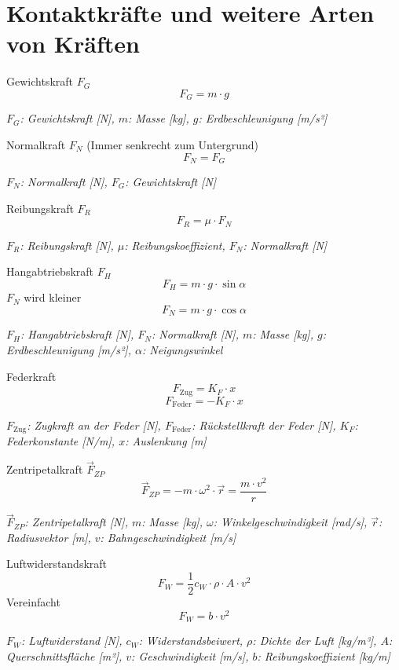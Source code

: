 \documentclass[a4paper,10pt]{article}
\newenvironment{displayformula}
{
	\begin{framed}
		\color{formulaColor}
	}
	{\end{framed}}
\newcommand{\formulalegend}[1]{%
	\par\vspace{0.5ex}%
	{{\color{legendColor}\RaggedRight\small\textit{#1}}}%
	\par\vspace{1.5ex}%
}
\begin{document}
\section{Kontaktkräfte und weitere Arten von Kräften}

\begin{displayformula}
	Gewichtskraft \( F_G \)
	\[
	F_G = m \cdot g
	\]
\end{displayformula}
\formulalegend{
	\( F_G \): Gewichtskraft [N], \( m \): Masse [kg], \( g \): Erdbeschleunigung [m/s²]
}

\begin{displayformula}
	Normalkraft \( F_N \) (Immer senkrecht zum Untergrund)
	\[
	F_N = F_G
	\]
\end{displayformula}
\formulalegend{
	\( F_N \): Normalkraft [N], \( F_G \): Gewichtskraft [N]
}

\begin{displayformula}
	Reibungskraft \( F_R \)
	\[
	F_R = \mu \cdot F_N
	\]
\end{displayformula}
\formulalegend{
	\( F_R \): Reibungskraft [N], \( \mu \): Reibungskoeffizient, \( F_N \): Normalkraft [N]
}

\begin{displayformula}
	Hangabtriebskraft \( F_H \)
	\[
	F_H = m \cdot g \cdot \sin\alpha
	\]
	\( F_N \) wird kleiner
	\[
	F_N = m \cdot g \cdot \cos\alpha
	\]
\end{displayformula}
\formulalegend{
	\( F_H \): Hangabtriebskraft [N], \( F_N \): Normalkraft [N], \( m \): Masse [kg], \( g \): Erdbeschleunigung [m/s²], \( \alpha \): Neigungswinkel
}

\begin{displayformula}
	Federkraft
	\[
	F_{\text{Zug}} = K_F \cdot x
	\]
	\[
	F_{\text{Feder}} = -K_F \cdot x
	\]
\end{displayformula}
\formulalegend{
	\( F_{\text{Zug}} \): Zugkraft an der Feder [N], \( F_{\text{Feder}} \): Rückstellkraft der Feder [N], \( K_F \): Federkonstante [N/m], \( x \): Auslenkung [m]
}

\begin{displayformula}
	Zentripetalkraft \( \vec{F}_{ZP} \)
	\[
	\vec{F}_{ZP} = -m \cdot \omega^2 \cdot \vec{r} = \frac{m \cdot v^2}{r}
	\]
\end{displayformula}
\formulalegend{
	\( \vec{F}_{ZP} \): Zentripetalkraft [N], \( m \): Masse [kg], \( \omega \): Winkelgeschwindigkeit [rad/s], \( \vec{r} \): Radiusvektor [m], \( v \): Bahngeschwindigkeit [m/s]
}

\begin{displayformula}
	Luftwiderstandskraft
	\[
	F_W = \frac{1}{2} c_W \cdot \rho \cdot A \cdot v^2
	\]
	Vereinfacht
	\[
	F_W = b \cdot v^2
	\]
\end{displayformula}
\formulalegend{
	\( F_W \): Luftwiderstand [N], \( c_W \): Widerstandsbeiwert, \( \rho \): Dichte der Luft [kg/m³], \( A \): Querschnittsfläche [m²], \( v \): Geschwindigkeit [m/s], \( b \): Reibungskoeffizient [kg/m]
}
\end{document}
